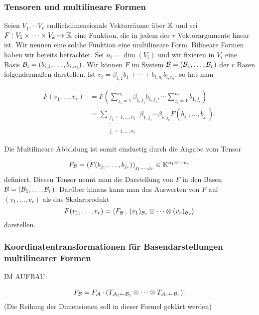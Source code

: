 	\subsubsection{Tensoren und multilineare Formen} 
	
	Seien $V_1, \cdots V_r$ endlichdimensionale Vektorräume über $\mathbb K$ und sei $F : V_1 \times \cdots \times V_k \mapsto \mathbb K$ eine Funktion, die in jedem der $r$ Vektorargumente linear ist. Wir nennen eine solche Funktion eine multilineare Form. Bilineare Formen haben wir bereits betrachtet. Sei $n_i  = \dim(V_i)$ und wir fixieren in $V_i$ eine Basis $\mathcal{B}_i = (b_{i,1},\ldots, b_{i,n_i})$. Wir können $F$ im System $\mathcal{B}= (\mathcal{B}_1,\ldots,\mathcal{B}_r)$ der $r$ Basen folgendermaßen darstellen. Ist $v_i = \beta_{i,1} b_1 + \cdots + b_{i,n_i} b_{i,n_i}$, so hat man 
	
	\begin{align*}
		F(v_1,\ldots,v_r) & = F \left( \sum_{j_1=1}^{n_1} \beta_{1,j_1} b_{1,j_1}, \cdots \sum_{j_r=1}^{n_r} b_{1,j_r} \right) 
		\\ & = \sum_{ \substack{ j_1 =1,\ldots,n_1 \\ \vdots \\ j_r = 1,\ldots,n_r} } \beta_{1,j_1} \cdots \beta_{r,j_r} F(b_{j_1},\ldots, b_{j_r}). 
	\end{align*}
	
	Die Multilineare Abbildung ist somit einduetig durch die Angabe vom Tensor 
	
	\begin{align*}
		F_{\mathcal{B}} = \left( F(b_{j_1},\ldots, b_{j_r}) \right)_{j_1,\ldots,j_r} \in \mathbb K^{n_1 \times \cdots n_r}
	\end{align*} 
	definiert. Diesen Tensor nennt man die Darstellung von $F$ in den Basen $\mathcal{B}=(\mathcal{B}_1,\ldots,\mathcal{B}_r)$.  Darüber hinaus kann man das Auswerten von $F$ auf $(v_1,\ldots,v_r)$ als das Skalarprodukt
	\[
	F(v_1,\ldots,v_r) = \left< F_{\mathcal{B}} \, , \, (v_1)_{\mathcal{B}_1} \otimes \cdots \otimes (v_r)_{\mathcal{B}_r} \right>
	\]
	darstellen. 
	
	\subsubsection{Koordinatentransformationen für Basendarstellungen multilinearer Formen}
	
	IM AUFBAU:  
	
	\begin{align*}
		F_{\mathcal{B}} = F_{\mathcal{A}} \cdot ( T_{\mathcal{A}_1 \leftarrow \mathcal{B}_1}  \otimes \cdots \otimes T_{\mathcal{A}_r \leftarrow \mathcal{B}_r} ). 
	\end{align*}
	(Die Reihung der Dimensionen soll in dieser Formel geklärt werden)
	
